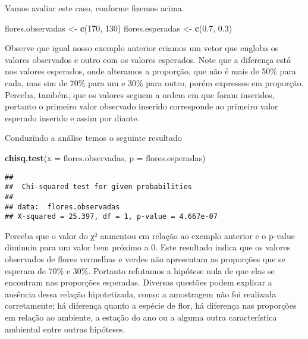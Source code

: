 \documentclass[]{book}
\newenvironment{Shaded}{\begin{snugshade}}{\end{snugshade}}
\newcommand{\DataTypeTok}[1]{\textcolor[rgb]{0.13,0.29,0.53}{#1}}
\newcommand{\DecValTok}[1]{\textcolor[rgb]{0.00,0.00,0.81}{#1}}
\newcommand{\FloatTok}[1]{\textcolor[rgb]{0.00,0.00,0.81}{#1}}
\newcommand{\KeywordTok}[1]{\textcolor[rgb]{0.13,0.29,0.53}{\textbf{#1}}}
\newcommand{\NormalTok}[1]{#1}
\newcommand{\StringTok}[1]{\textcolor[rgb]{0.31,0.60,0.02}{#1}}
\begin{document}
Vamos avaliar este caso, conforme fizemos acima.

\begin{Shaded}
\begin{Highlighting}[]
\NormalTok{flores.observadas <-}\StringTok{ }\KeywordTok{c}\NormalTok{(}\DecValTok{170}\NormalTok{, }\DecValTok{130}\NormalTok{)}
\NormalTok{flores.esperadas <-}\StringTok{ }\KeywordTok{c}\NormalTok{(}\FloatTok{0.7}\NormalTok{, }\FloatTok{0.3}\NormalTok{)}
\end{Highlighting}
\end{Shaded}

Observe que igual nosso exemplo anterior criamos um vetor que engloba os valores observados e outro com os valores esperados. Note que a diferença está nos valores esperados, onde alteramos a proporção, que não é mais de 50\% para cada, mas sim de 70\% para um e 30\% para outro, porém expressos em proporção. Perceba, também, que os valores seguem a ordem em que foram inseridos, portanto o primeiro valor observado inserido corresponde ao primeiro valor esperado inserido e assim por diante.

Conduzindo a análise temos o seguinte resultado

\begin{Shaded}
\begin{Highlighting}[]
\KeywordTok{chisq.test}\NormalTok{(}\DataTypeTok{x =}\NormalTok{ flores.observadas, }\DataTypeTok{p =}\NormalTok{ flores.esperadas)}
\end{Highlighting}
\end{Shaded}

\begin{verbatim}
## 
##  Chi-squared test for given probabilities
## 
## data:  flores.observadas
## X-squared = 25.397, df = 1, p-value = 4.667e-07
\end{verbatim}

Perceba que o valor do χ² aumentou em relação ao exemplo anterior e o p-value diminuiu para um valor bem próximo a 0. Este resultado indica que os valores observados de flores vermelhas e verdes não apresentam as proporções que se esperam de 70\% e 30\%. Portanto refutamos a hipótese nula de que elas se encontram nas proporções esperadas. Diversas questões podem explicar a ausência dessa relação hipotetizada, como: a amostragem não foi realizada corretamente; há diferença quanto a espécie de flor, há diferença nas proporções em relação ao ambiente, a estação do ano ou a alguma outra característica ambiental entre outras hipóteses.
\end{document}
